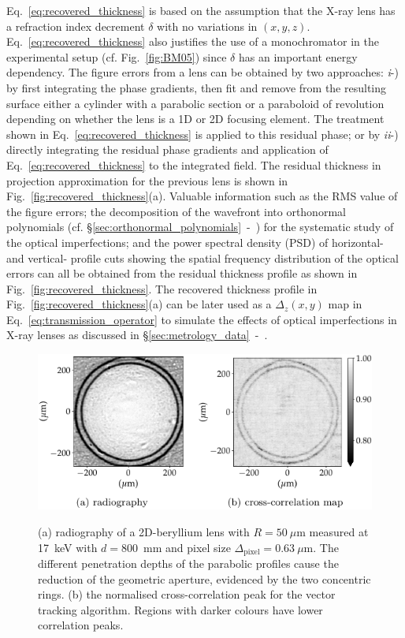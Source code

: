 \begin{refsection}
Eq.~\ref{eq:recovered_thickness} is based on the assumption that the X-ray lens has a refraction index decrement $\delta$ with no variations in $(x,y,z)$. Eq.~\ref{eq:recovered_thickness} also justifies the use of a monochromator in the experimental setup (cf. Fig.~\ref{fig:BM05}) since $\delta$ has an important energy dependency. The figure errors from a lens can be obtained by two approaches: \textit{i}-) by first integrating the phase gradients, then fit and remove from the resulting surface either a cylinder with a parabolic section or a paraboloid of revolution depending on whether the lens is a 1D or 2D focusing element. The treatment shown in Eq.~\ref{eq:recovered_thickness} is applied to this residual phase; or by \textit{ii}-) directly integrating the residual phase gradients and application of Eq.~\ref{eq:recovered_thickness} to the integrated field. The residual thickness in projection approximation for the previous lens is shown in Fig.~\ref{fig:recovered_thickness}(a). Valuable information such as the RMS value of the figure errors; the decomposition of the wavefront into orthonormal polynomials (cf. \S\ref{sec:orthonormal_polynomials}~-~\textit{}) for the systematic study of the optical imperfections; and the power spectral density (PSD) of horizontal- and vertical- profile cuts showing the spatial frequency distribution of the optical errors can all be obtained from the residual thickness profile as shown in Fig.~\ref{fig:recovered_thickness}. The recovered thickness profile in Fig.~\ref{fig:recovered_thickness}(a) can be later used as a $\Delta_z(x,y)$ map in Eq.~\ref{eq:transmission_operator} to simulate the effects of optical imperfections in X-ray lenses as discussed in \S\ref{sec:metrology_data}~-~\textit{}. 

\begin{figure}[t]
        \centering
        {\includegraphics[width=.5\linewidth]{figures/ch04b/radio_corr_map.pdf}}
        \caption[Normalised cross-correlation map]{(a) radiography of a 2D-beryllium lens with $R=50~\mu$m measured at 17~keV with $d=800$~mm and pixel size $\Delta_\text{pixel}= 0.63~\mu$m. The different penetration depths of the parabolic profiles cause the reduction of the geometric aperture, evidenced by the two concentric rings. (b) the normalised cross-correlation peak for the vector tracking algorithm. Regions with darker colours have lower correlation peaks.}\label{fig:cross-correlation-map}
\end{figure}



\end{refsection}
